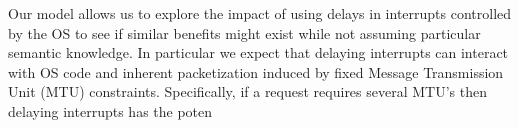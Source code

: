 Our model allows us to explore the impact of using delays in interrupts controlled by the OS to see if similar benefits  might exist while not assuming particular semantic knowledge.  In particular we expect that delaying interrupts can interact with OS code and inherent packetization induced by fixed Message Transmission Unit (MTU) constraints.  Specifically, if a request requires several MTU's then delaying interrupts has the poten


%
%
%
%

